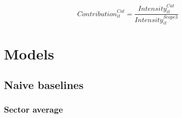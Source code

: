 \documentclass[12pt,twoside]{report}
\begin{document}
\begin{equation}
    \mathit{Contribution}_{it}^{Cat} = \frac{\mathit{Intensity}_{it}^{Cat}}{\mathit{Intensity}_{it}^{Scope3}}
\end{equation}

\chapter{Models}
\section{Naive baselines}
\subsection{Sector average}



\end{document}
